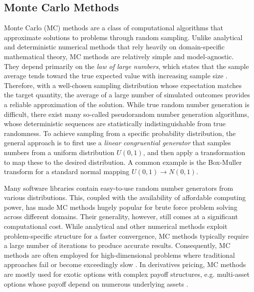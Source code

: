 \documentclass[english,12pt,a4paper,pdftex,sci,utf8]{aaltothesis}
\begin{document}
\subsection{Monte Carlo Methods}
Monte Carlo (MC) methods are a class of computational algorithms that approximate solutions to problems through random sampling. Unlike analytical and deterministic numerical methods that rely heavily on domain-specific mathematical theory, MC methods are relatively simple and model-agnostic. They depend primarily on the \emph{law of large numbers}, which states that the sample average tends toward the true expected value with increasing sample size \cite{Ross2020prob}. Therefore, with a well-chosen sampling distribution whose expectation matches the target quantity, the average of a large number of simulated outcomes provides a reliable approximation of the solution. While true random number generation is difficult, there exist many so-called pseudorandom number generation algorithms, whose deterministic sequences are statistically indistinguishable from true randomness. To achieve sampling from a specific probability distribution, the general approach is to first use a \emph{linear congruential generator} that samples numbers from a uniform distribution $U(0,1)$, and then apply a transformation to map these to the desired distribution. A common example is the Box-Muller transform for a standard normal mapping $U(0,1) \rightarrow N(0,1)$. \cite{gentle2003random}

Many software libraries contain easy-to-use random number generators from various distributions. This, coupled with the availability of affordable computing power, has made MC methods hugely popular for brute force problem solving across different domains. Their generality, however, still comes at a significant computational cost. While analytical and other numerical methods exploit problem-specific structure for a faster convergence, MC methods typically require a large number of iterations to produce accurate results. Consequently, MC methods are often employed for high-dimensional problems where traditional approaches fail or become exceedingly slow \cite{gentle2003random}. In derivatives pricing, MC methods are mostly used for exotic options with complex payoff structures, e.g. multi-asset options whose payoff depend on numerous underlying assets \cite{hull2016options,wilmott2013paul}.
\end{document}

